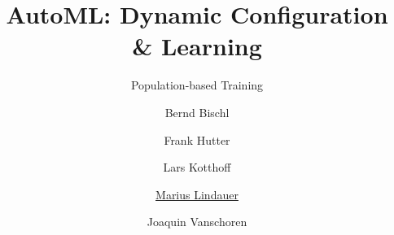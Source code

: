 




\title[AutoML: PBT]{AutoML: Dynamic Configuration \& Learning}
\subtitle{Population-based Training}
\author[Marius Lindauer]{Bernd Bischl \and Frank Hutter \and Lars Kotthoff\newline \and \underline{Marius Lindauer} \and Joaquin Vanschoren}
\institute{}
\date{}





	
	\maketitle
	
